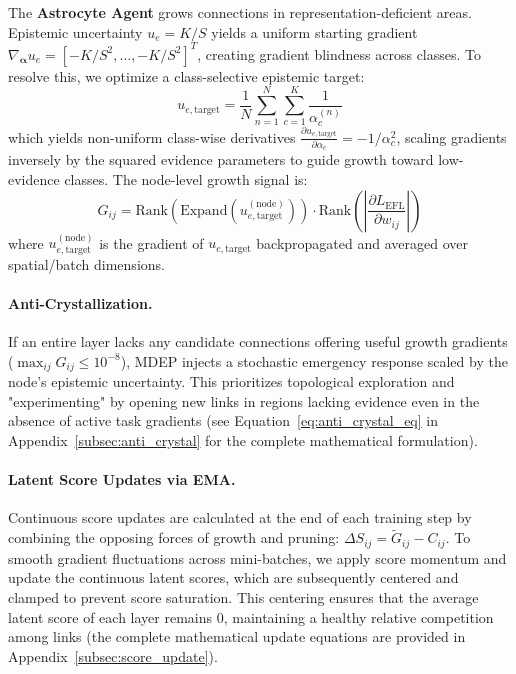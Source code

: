 \documentclass[letterpaper]{article} %
\begin{document}
The \textbf{Astrocyte Agent} grows connections in representation-deficient areas. Epistemic uncertainty $u_e = K/S$ yields a uniform starting gradient $\nabla_{\bm{\alpha}} u_e = [-K/S^2, \ldots, -K/S^2]^T$, creating gradient blindness across classes. To resolve this, we optimize a class-selective epistemic target:
\begin{equation}\label{eq:u_e_target}
    u_{e,\text{target}} = \frac{1}{N} \sum_{n=1}^N \sum_{c=1}^K \frac{1}{\alpha_c^{(n)}}
\end{equation}
which yields non-uniform class-wise derivatives $\frac{\partial u_{e,\text{target}}}{\partial \alpha_c} = -1/\alpha_c^2$, scaling gradients inversely by the squared evidence parameters to guide growth toward low-evidence classes. The node-level growth signal is:
\begin{equation}\label{eq:G_ij}
    G_{ij} = \text{Rank}(\text{Expand}(u_{e,\text{target}}^{(\text{node})})) \cdot \text{Rank}\!\left(\left|\frac{\partial L_{\text{EFL}}}{\partial w_{ij}}\right|\right)
\end{equation}
where $u_{e,\text{target}}^{(\text{node})}$ is the gradient of $u_{e,\text{target}}$ backpropagated and averaged over spatial/batch dimensions. 

\paragraph{Anti-Crystallization.} If an entire layer lacks any candidate connections offering useful growth gradients ($\max_{ij} G_{ij} \le 10^{-8}$), MDEP injects a stochastic emergency response scaled by the node's epistemic uncertainty. This prioritizes topological exploration and "experimenting" by opening new links in regions lacking evidence even in the absence of active task gradients (see Equation~\ref{eq:anti_crystal_eq} in Appendix~\ref{subsec:anti_crystal} for the complete mathematical formulation).

\paragraph{Latent Score Updates via EMA.} Continuous score updates are calculated at the end of each training step by combining the opposing forces of growth and pruning: $\Delta S_{ij} = \tilde{G}_{ij} - C_{ij}$. To smooth gradient fluctuations across mini-batches, we apply score momentum and update the continuous latent scores, which are subsequently centered and clamped to prevent score saturation. This centering ensures that the average latent score of each layer remains 0, maintaining a healthy relative competition among links (the complete mathematical update equations are provided in Appendix~\ref{subsec:score_update}).
\end{document}
